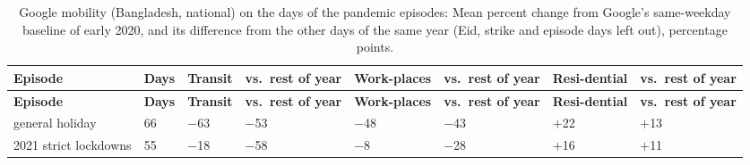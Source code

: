 \begingroup\scriptsize
\begin{longtable}{L{3.2cm} C{0.8cm} C{1.4cm} C{1.6cm} C{1.4cm} C{1.6cm} C{1.4cm} C{1.6cm}}
\caption{Google mobility (Bangladesh, national) on the days of the pandemic episodes: Mean percent change from Google's same-weekday baseline of early 2020, and its difference from the other days of the same year (Eid, strike and episode days left out), percentage points.}\label{tab:s-long-mobility}\\
\toprule
\textbf{Episode} & \textbf{Days} & \textbf{Transit} & \textbf{vs.\ rest of year} & \textbf{Work-places} & \textbf{vs.\ rest of year} & \textbf{Resi-dential} & \textbf{vs.\ rest of year} \\
\midrule\endfirsthead
\toprule
\textbf{Episode} & \textbf{Days} & \textbf{Transit} & \textbf{vs.\ rest of year} & \textbf{Work-places} & \textbf{vs.\ rest of year} & \textbf{Resi-dential} & \textbf{vs.\ rest of year} \\
\midrule\endhead
\bottomrule{} general holiday & 66 & $-$63 & $-$53 & $-$48 & $-$43 & $+$22 & $+$13 \\
2021 strict lockdowns & 55 & $-$18 & $-$58 & $-$8 & $-$28 & $+$16 & $+$11 \\
\end{longtable}
\endgroup
